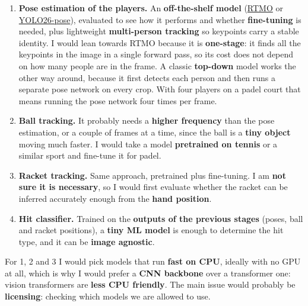 \documentclass[11pt,a4paper]{article}
\begin{document}
\begin{enumerate}
  \item \textbf{Pose estimation of the players.} An \textbf{off-the-shelf model}
    (\href{https://arxiv.org/abs/2312.07526}{RTMO} or
    \href{https://huggingface.co/Ultralytics/YOLO26}{YOLO26-pose}), evaluated to see how it
    performs and whether \textbf{fine-tuning} is needed,
    plus lightweight \textbf{multi-person tracking} so keypoints carry a stable identity.
    I would lean towards RTMO because it is \textbf{one-stage}: it finds all the
    keypoints in the image in a single forward pass, so its
    cost does not depend on how many people are in the frame. A classic \textbf{top-down}
    model works the other way around, because it first detects each person and then runs a
    separate pose network on every crop. With four players on a padel court that means running
    the pose network four times per frame.
  \item \textbf{Ball tracking.} It probably needs a \textbf{higher frequency} than the pose
    estimation, or a couple of frames at a time, since the ball is a \textbf{tiny object}
    moving much faster. I would take a model \textbf{pretrained on tennis} or a similar sport
    and fine-tune it for padel.
  \item \textbf{Racket tracking.} Same approach, pretrained plus fine-tuning. I am \textbf{not
    sure it is necessary}, so I would first evaluate whether the racket can be inferred
    accurately enough from the \textbf{hand position}.
  \item \textbf{Hit classifier.} Trained on the \textbf{outputs of the previous stages}
    (poses, ball and racket positions), a \textbf{tiny ML model} is enough to determine the
    hit type, and it can be \textbf{image agnostic}.
\end{enumerate}

For 1, 2 and 3 I would pick models that run \textbf{fast on CPU}, ideally with no GPU at all,
which is why I would prefer a \textbf{CNN backbone} over a transformer one: vision
transformers are \textbf{less CPU friendly}. The main issue would probably be
\textbf{licensing}: checking which models we are allowed to use.
\end{document}
